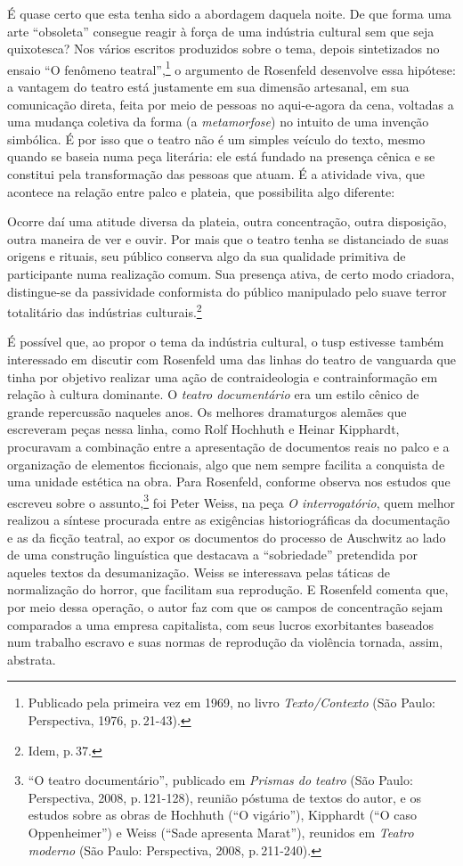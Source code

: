 É quase certo que esta tenha sido a abordagem daquela noite. De que
forma uma arte “obsoleta” consegue reagir à força de uma indústria
cultural sem que seja quixotesca? Nos vários escritos produzidos
sobre o tema, depois sintetizados no ensaio “O fenômeno teatral”,\footnote{Publicado pela primeira vez em 1969, no livro
{\it Texto/Contexto} (São Paulo: Perspectiva, 1976, p.\,21-43).}
o argumento de Rosenfeld desenvolve essa hipótese: a vantagem do teatro
está justamente em sua dimensão artesanal, em sua comunicação direta,
feita por meio de pessoas no aqui-e-agora da cena, voltadas a uma
mudança coletiva da forma (a {\it metamorfose}) no intuito de uma
invenção simbólica. É por isso que o teatro não é um simples veículo do
texto, mesmo quando se baseia numa peça literária: ele está fundado na
presença cênica e se constitui pela transformação das pessoas que atuam.
É a atividade viva, que acontece na relação entre palco e plateia, que
possibilita algo diferente:

\startblockquote
Ocorre daí uma atitude diversa da plateia, outra concentração, outra
disposição, outra maneira de ver e ouvir. Por mais que o teatro tenha se
distanciado de suas origens e rituais, seu público conserva algo da sua
qualidade primitiva de participante numa realização comum. Sua presença
ativa, de certo modo criadora, distingue-se da passividade conformista
do público manipulado pelo suave terror totalitário das indústrias
culturais.\footnote{Idem, p.\,37.}
\stopblockquote

É possível que, ao propor o tema da indústria cultural, o {\sc tusp} estivesse
também interessado em discutir com Rosenfeld uma das linhas do teatro de
vanguarda que tinha por objetivo realizar uma ação de contraideologia e
contrainformação em relação à cultura dominante. O {\it teatro
documentário} era um estilo cênico de grande repercussão naqueles anos.
Os melhores dramaturgos alemães que escreveram peças nessa linha,
como Rolf Hochhuth e Heinar Kipphardt, procuravam a combinação
entre a apresentação de documentos reais no palco e a organização de
elementos ficcionais, algo que nem sempre facilita a conquista de uma
unidade estética na obra. Para Rosenfeld, conforme observa nos estudos
que escreveu sobre o assunto,\footnote{“O teatro documentário”,
  publicado em {\it Prismas do teatro} (São Paulo: Perspectiva, 2008, p.\,121-128), reunião póstuma de textos do autor, e os estudos sobre as
  obras de Hochhuth (“O vigário”), Kipphardt (“O caso
  Oppenheimer”) e Weiss (“Sade apresenta Marat”), reunidos em
  {\it Teatro moderno} (São Paulo: Perspectiva, 2008, p.\,211-240).} foi
Peter Weiss, na peça {\it O interrogatório}, quem melhor realizou a
síntese procurada entre as exigências historiográficas da documentação e
as da ficção teatral, ao expor os documentos do processo de Auschwitz ao
lado de uma construção linguística que destacava a “sobriedade”
pretendida por aqueles textos da desumanização. Weiss se interessava pelas
táticas de normalização do horror, que facilitam sua reprodução. E
Rosenfeld comenta que, por meio dessa operação, o autor faz com que os
campos de concentração sejam comparados a uma empresa capitalista, com
seus lucros exorbitantes baseados num trabalho escravo e suas
normas de reprodução da violência tornada, assim, abstrata.

